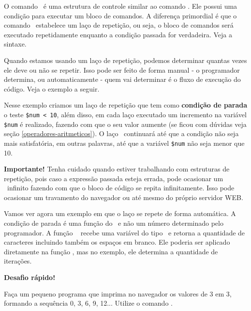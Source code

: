 O comando \comandowhile~é uma estrutura de controle similar ao comando \comandoif. Ele possui 
uma condição para executar um bloco de comandos. A diferença primordial é que o comando 
\comandowhile~estabelece um laço de repetição, ou seja, o bloco de comandos será executado 
repetidamente enquanto a condição passada for verdadeira. Veja a sintaxe.



Quando estamos usando um laço de repetição, podemos determinar quantas vezes ele deve 
ou não se repetir. Isso pode ser feito de forma manual - o programador determina, 
ou automaticamente - quem vai determinar é o fluxo de execução do código. Veja o exemplo
a seguir.



Nesse exemplo criamos um laço de repetição que tem como \textbf{condição de parada} o 
teste \texttt{\$num < 10}, além disso, em cada laço executado um incremento 
na variável \texttt{\$num} é realizado, fazendo com que o seu valor aumente 
(se ficou com dúvidas veja seção \ref{operadores-aritmeticos}). O laço 
\comandowhile~continuará até que a condição não seja mais satisfatória, 
em outras palavras, até que a variável \texttt{\$num} não seja menor que 10.


\begin{framed}
\textbf{{\Large Importante!}}
Tenha cuidado quando estiver trabalhando com estruturas de repetição, pois caso a expressão 
passada esteja errada, pode ocasionar um \lacoloop~infinito fazendo com que o bloco de 
código se repita infinitamente. Isso pode ocasionar um travamento do navegador ou 
até mesmo do próprio servidor WEB.
\end{framed}

Vamos ver agora um exemplo em que o laço se repete de forma automática. A condição de parada 
é uma função do \php~e não um número determinado pelo programador. A função \comandostrlen~
recebe uma variável do tipo \tipostring~e retorna a quantidade de caracteres incluindo 
também os espaços em branco. Ele poderia ser aplicado diretamente na função \funcaoecho, 
mas no exemplo, ele determina a quantidade de iterações. 



\begin{framed}
\textbf{{\Large Desafio rápido!}}

Faça um pequeno programa que imprima no navegador os valores de 3 em 3, formando
a sequência 0, 3, 6, 9, 12... Utilize o comando \comandowhile. 

\end{framed}


